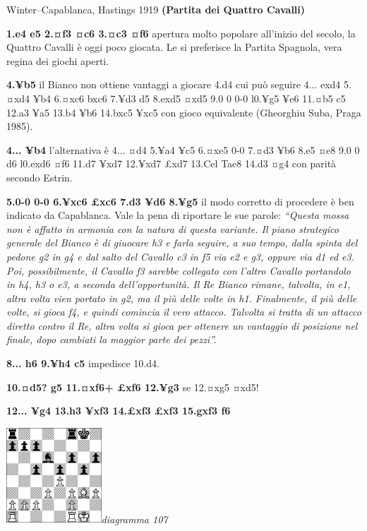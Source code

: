 \documentclass[
]{article}
\begin{document}
Winter--Capablanca, Hastings 1919 \textbf{(Partita dei Quattro Cavalli)}

\textbf{1.e4 e5 2.¤f3 ¤c6 3.¤c3 ¤f6} apertura molto popolare all'inizio
del secolo, la Quattro Cavalli è oggi poco giocata. Le si preferisce la
Partita Spagnola, vera regina dei giochi aperti.

\textbf{4.¥b5} il Bianco non ottiene vantaggi a giocare 4.d4 cui può
seguire 4... exd4 5.¤xd4 ¥b4 6.¤xc6 bxc6 7.¥d3 d5 8.exd5 ¤xd5 9.0 0 0-0
l0.¥g5 ¥e6 11.¤b5 c5 12.a3 ¥a5 13.b4 ¥b6 14.bxc5 ¥xc5 con gioco
equivalente (Gheorghiu Suba, Praga 1985).

\textbf{4... ¥b4} l'alternativa è 4... ¤d4 5.¥a4 ¥c5 6.¤xe5 0-0 7.¤d3
¥b6 8.e5 ¤e8 9.0 0 d6 l0.exd6 ¤f6 11.d7 ¥xd7 12.¥xd7 £xd7 13.Cel Tae8
14.d3 ¤g4 con parità secondo Estrin.

\textbf{5.0-0 0-0 6.¥xc6 £xc6 7.d3 ¥d6 8.¥g5} il modo corretto di
procedere è ben indicato da Capablanca. Vale la pena di riportare le sue
parole: \emph{``Questa mossa non è affatto in armonia con la natura di
questa variante. Il piano strategico generale del Bianco è di giuocare
h3 e farla seguire, a suo tempo, dalla spinta del pedone g2 in g4 e dal
salto del Cavallo c3 in f5 via e2 e g3, oppure via d1 ed e3. Poi,
possibilmente, il Cavallo f3 sarebbe collegato con l'altro Cavallo
portandolo in h4, h3 o e3, a seconda dell'opportunità. Il Re Bianco
rimane, talvolta, in e1, altra volta vien portato in g2, ma il più delle
volte in h1. Finalmente, il più delle volte, si gioca f4, e quindi
comincia il vero attacco. Talvolta si tratta di un attacco diretto
contro il Re, altra volta si gioca per ottenere un vantaggio di
posizione nel finale, dopo cambiati la maggior parte dei pezzi''.}

\textbf{8... h6 9.¥h4 c5} impedisce 10.d4.

\textbf{10.¤d5? g5 11.¤xf6+ £xf6 12.¥g3} se 12.¤xg5 ¤xd5!

\textbf{12... ¥g4 13.h3 ¥xf3 14.£xf3 £xf3 15.gxf3 f6}

\includegraphics[width=1.40139in,height=1.40139in]{vertopal_109f12be458a423d8f3cc838880eaea2/media/image107.png}\emph{diagramma
107}
\end{document}
